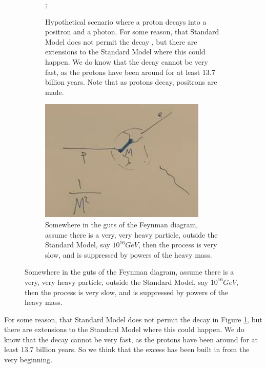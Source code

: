 \documentclass[]{article}
\begin{document}
\begin{figure}[H]
	\caption{Proton decay}
	\begin{subfigure}[b]{0.47\textwidth}
		\caption{Hypothetical scenario where a proton decays into a positron and a photon. For some reason, that Standard Model does not permit the decay , but there are extensions to the Standard Model where this could happen. We do know that the decay cannot be very fast, as the protons have been around for at least 13.7 billion years. Note that as protons decay, positrons are made.}\label{fig:cosmo-8-proton-decay}
		\begin{center}
			;
		\end{center}
	\end{subfigure}
	\begin{subfigure}[b]{0.47\textwidth}
		\caption{Somewhere in the guts of the Feynman diagram, assume there is a very, very heavy particle, outside the Standard Model, say $10^{16}GeV$, then the process is very slow, and is suppressed by powers of the heavy mass.}\label{fig:cosmo-8-proton-decay-mechanism}
		\begin{center}
			\includegraphics[width=\textwidth]{cosmo-8-proton-decay-mechanism}
		\end{center}
	\end{subfigure}	
\end{figure}

For some reason, that Standard Model does not permit the decay in Figure \ref{fig:cosmo-8-proton-decay}, but there are extensions to the Standard Model where this could happen. We do know that the decay cannot be very fast, as the protons have been around for at least 13.7 billion years. So we think that the excess has been built in from the very beginning.
\end{document}
